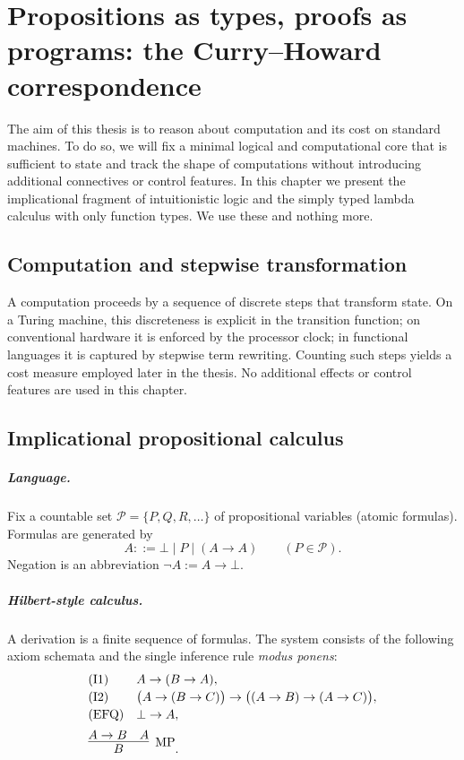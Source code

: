 \chapter[Propositions as types]{Propositions as types, proofs as programs: the Curry--Howard correspondence}
\label{chap:curry-howard}

The aim of this thesis is to reason about computation and its cost on standard machines. To do so, we will fix a minimal logical and computational core that is sufficient to state and track the shape of computations without introducing additional connectives or control features. In this chapter we present the implicational fragment of intuitionistic logic and the simply typed lambda calculus with only function types. We use these and nothing more.

\section{Computation and stepwise transformation}
A computation proceeds by a sequence of discrete steps that transform state. On a Turing machine, this discreteness is explicit in the transition function; on conventional hardware it is enforced by the processor clock; in functional languages it is captured by stepwise term rewriting. Counting such steps yields a cost measure employed later in the thesis. No additional effects or control features are used in this chapter.



\section{Implicational propositional calculus}
\label{sec:ipc}

\paragraph{Language.}
Fix a countable set $\mathcal{P}=\{P,Q,R,\dots\}$ of propositional variables (atomic formulas). Formulas are generated by
\[
A ::= \bot \mid P \mid (A \to A) \qquad (P \in \mathcal{P}).
\]
Negation is an abbreviation $\neg A := A \to \bot$.

\paragraph{Hilbert-style calculus.}
A derivation is a finite sequence of formulas. The system consists of the following axiom schemata and the single inference rule \emph{modus ponens}:
\[
\begin{array}{ll}
\text{(I1)} & A \to (B \to A), \\[2pt]
\text{(I2)} & \bigl(A \to (B \to C)\bigr) \to \bigl((A \to B) \to (A \to C)\bigr), \\[2pt]
\text{(EFQ)} & \bot \to A, \\[6pt]
\multicolumn{2}{l}{\infer[\mathrm{MP}]{B}{A \to B \quad A}.}
\end{array}
\]

